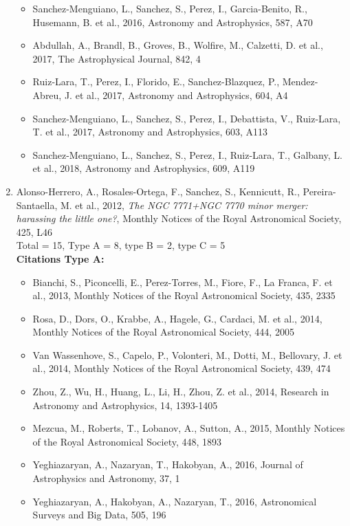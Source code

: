 \documentclass{letter}
\begin{document}
\begin{enumerate}
\begin{itemize}
\item Sanchez-Menguiano, L., Sanchez, S., Perez, I., Garcia-Benito, R., Husemann, B. et al., 2016, Astronomy and Astrophysics, 587, A70
\item Abdullah, A., Brandl, B., Groves, B., Wolfire, M., Calzetti, D. et al., 2017, The Astrophysical Journal, 842, 4
\item Ruiz-Lara, T., Perez, I., Florido, E., Sanchez-Blazquez, P., Mendez-Abreu, J. et al., 2017, Astronomy and Astrophysics, 604, A4
\item Sanchez-Menguiano, L., Sanchez, S., Perez, I., Debattista, V., Ruiz-Lara, T. et al., 2017, Astronomy and Astrophysics, 603, A113
\item Sanchez-Menguiano, L., Sanchez, S., Perez, I., Ruiz-Lara, T., Galbany, L. et al., 2018, Astronomy and Astrophysics, 609, A119
\end{itemize}
\item Alonso-Herrero, A., Rosales-Ortega, F., Sanchez, S., Kennicutt, R., Pereira-Santaella, M. et al., 2012, {\it The NGC 7771+NGC 7770 minor merger: harassing the little one?}, Monthly Notices of the Royal Astronomical Society, 425, L46 \\ 
Total = 15, Type A = 8, type B = 2, type C = 5 \\ 
{\bf Citations Type A:}
\begin{itemize}
\item Bianchi, S., Piconcelli, E., Perez-Torres, M., Fiore, F., La Franca, F. et al., 2013, Monthly Notices of the Royal Astronomical Society, 435, 2335
\item Rosa, D., Dors, O., Krabbe, A., Hagele, G., Cardaci, M. et al., 2014, Monthly Notices of the Royal Astronomical Society, 444, 2005
\item Van Wassenhove, S., Capelo, P., Volonteri, M., Dotti, M., Bellovary, J. et al., 2014, Monthly Notices of the Royal Astronomical Society, 439, 474
\item Zhou, Z., Wu, H., Huang, L., Li, H., Zhou, Z. et al., 2014, Research in Astronomy and Astrophysics, 14, 1393-1405
\item Mezcua, M., Roberts, T., Lobanov, A., Sutton, A., 2015, Monthly Notices of the Royal Astronomical Society, 448, 1893
\item Yeghiazaryan, A., Nazaryan, T., Hakobyan, A., 2016, Journal of Astrophysics and Astronomy, 37, 1
\item Yeghiazaryan, A., Hakobyan, A., Nazaryan, T., 2016, Astronomical Surveys and Big Data, 505, 196

\end{itemize}
\end{enumerate}
\end{document}
